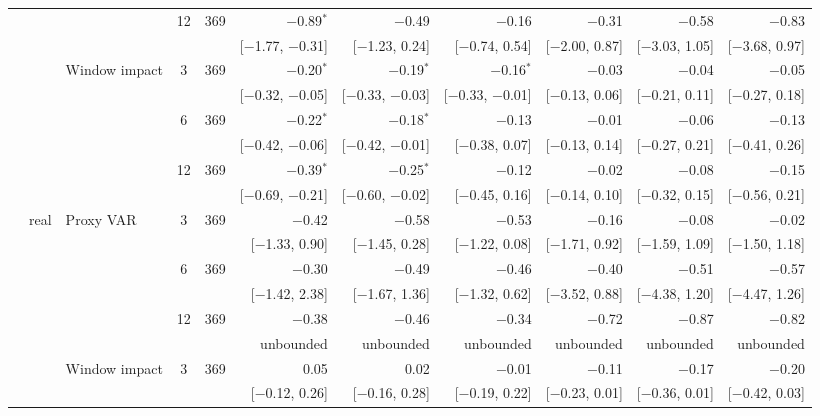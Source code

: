 \begin{table}[tp]
{\begin{tabular}{lllcrrrrrrr}
 &  &  & 12 & 369 & $-$0.89$^{*}$ & $-$0.49 & $-$0.16 & $-$0.31 & $-$0.58 & $-$0.83\\
 & & & & & {\tiny [$-$1.77, $-$0.31]} & {\tiny [$-$1.23, 0.24]} & {\tiny [$-$0.74, 0.54]} & {\tiny [$-$2.00, 0.87]} & {\tiny [$-$3.03, 1.05]} & {\tiny [$-$3.68, 0.97]}\\
 &  & Window impact & 3 & 369 & $-$0.20$^{*}$ & $-$0.19$^{*}$ & $-$0.16$^{*}$ & $-$0.03 & $-$0.04 & $-$0.05\\
 & & & & & {\tiny [$-$0.32, $-$0.05]} & {\tiny [$-$0.33, $-$0.03]} & {\tiny [$-$0.33, $-$0.01]} & {\tiny [$-$0.13, 0.06]} & {\tiny [$-$0.21, 0.11]} & {\tiny [$-$0.27, 0.18]}\\
 &  &  & 6 & 369 & $-$0.22$^{*}$ & $-$0.18$^{*}$ & $-$0.13 & $-$0.01 & $-$0.06 & $-$0.13\\
 & & & & & {\tiny [$-$0.42, $-$0.06]} & {\tiny [$-$0.42, $-$0.01]} & {\tiny [$-$0.38, 0.07]} & {\tiny [$-$0.13, 0.14]} & {\tiny [$-$0.27, 0.21]} & {\tiny [$-$0.41, 0.26]}\\
 &  &  & 12 & 369 & $-$0.39$^{*}$ & $-$0.25$^{*}$ & $-$0.12 & $-$0.02 & $-$0.08 & $-$0.15\\
 & & & & & {\tiny [$-$0.69, $-$0.21]} & {\tiny [$-$0.60, $-$0.02]} & {\tiny [$-$0.45, 0.16]} & {\tiny [$-$0.14, 0.10]} & {\tiny [$-$0.32, 0.15]} & {\tiny [$-$0.56, 0.21]}\\
 & real & Proxy VAR & 3 & 369 & $-$0.42 & $-$0.58 & $-$0.53 & $-$0.16 & $-$0.08 & $-$0.02\\
 & & & & & {\tiny [$-$1.33, 0.90]} & {\tiny [$-$1.45, 0.28]} & {\tiny [$-$1.22, 0.08]} & {\tiny [$-$1.71, 0.92]} & {\tiny [$-$1.59, 1.09]} & {\tiny [$-$1.50, 1.18]}\\
 &  &  & 6 & 369 & $-$0.30 & $-$0.49 & $-$0.46 & $-$0.40 & $-$0.51 & $-$0.57\\
 & & & & & {\tiny [$-$1.42, 2.38]} & {\tiny [$-$1.67, 1.36]} & {\tiny [$-$1.32, 0.62]} & {\tiny [$-$3.52, 0.88]} & {\tiny [$-$4.38, 1.20]} & {\tiny [$-$4.47, 1.26]}\\
 &  &  & 12 & 369 & $-$0.38 & $-$0.46 & $-$0.34 & $-$0.72 & $-$0.87 & $-$0.82\\
 & & & & & {\tiny unbounded} & {\tiny unbounded} & {\tiny unbounded} & {\tiny unbounded} & {\tiny unbounded} & {\tiny unbounded}\\
 &  & Window impact & 3 & 369 & 0.05 & 0.02 & $-$0.01 & $-$0.11 & $-$0.17 & $-$0.20\\
 & & & & & {\tiny [$-$0.12, 0.26]} & {\tiny [$-$0.16, 0.28]} & {\tiny [$-$0.19, 0.22]} & {\tiny [$-$0.23, 0.01]} & {\tiny [$-$0.36, 0.01]} & {\tiny [$-$0.42, 0.03]}\\

\end{tabular}}
\end{table}
